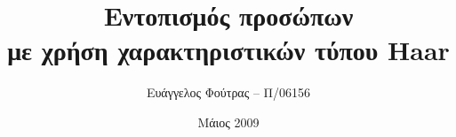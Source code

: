 \documentclass{beamer}
\title[Εντοπισμός προσώπων με Haar-like χαρακτηριστικά]{Εντοπισμός προσώπων\\με χρήση χαρακτηριστικών
	τύπου Haar}
\author{Ευάγγελος Φούτρας -- Π/06156}
\institute{Πανεπιστήμιο Πειραιώς}
\date{Μάιος 2009}
\begin{document}
\begin{frame}
\titlepage
\end{frame}

\begin{frame}

\end{frame}
\end{document}
